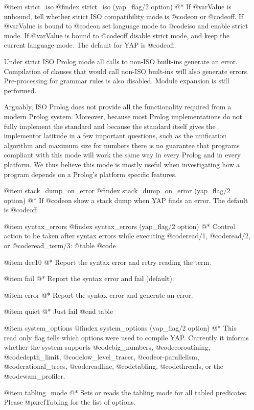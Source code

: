 {{{{{{{{{@item strict_iso
@findex strict_iso (yap_flag/2 option)
@*
 If @var{Value} is unbound, tell whether strict ISO compatibility mode
is @code{on} or @code{off}. If @var{Value} is bound to @code{on} set
language mode to @code{iso} and enable strict mode. If @var{Value} is
bound to @code{off} disable strict mode, and keep the current language
mode. The default for YAP is @code{off}.

Under strict ISO Prolog mode all calls to non-ISO built-ins generate an
error. Compilation of clauses that would call non-ISO built-ins will
also generate errors. Pre-processing for grammar rules is also
disabled. Module expansion is still performed.

Arguably, ISO Prolog does not provide all the functionality required
from a modern Prolog system. Moreover, because most Prolog
implementations do not fully implement the standard and because the
standard itself gives the implementor latitude in a few important
questions, such as the unification algorithm and maximum size for
numbers there is no guarantee that programs compliant with this mode
will work the same way in every Prolog and in every platform. We thus
believe this mode is mostly useful when investigating how a program
depends on a Prolog's platform specific features.

@item  stack_dump_on_error
@findex stack_dump_on_error (yap_flag/2 option)
@*
If @code{on} show a stack dump when YAP finds an error. The default is
@code{off}.

@item  syntax_errors
@findex syntax_errors (yap_flag/2 option)
@*
Control action to be taken after syntax errors while executing @code{read/1},
@code{read/2}, or @code{read_term/3}:
@table @code

@item dec10
@*
Report the syntax error and retry reading the term.
 
@item fail
@*
Report the syntax error and fail (default).

@item error
@*
Report the syntax error and generate an error.

@item quiet
@*
Just fail
@end table

@item system_options
@findex system_options (yap_flag/2 option)
@* This read only flag tells which options were used to compile
YAP. Currently it informs whether the system supports @code{big_numbers},
@code{coroutining}, @code{depth_limit}, @code{low_level_tracer},
@code{or-parallelism}, @code{rational_trees}, @code{readline}, @code{tabling},
@code{threads}, or the @code{wam_profiler}.

@item tabling_mode
@* Sets or reads the tabling mode for all tabled predicates. Please
@pxref{Tabling} for the list of options.

}}}}}}}}}
